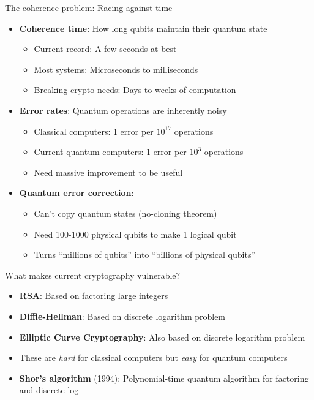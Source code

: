 \documentclass[aspectratio=169, lualatex, handout]{beamer}
\begin{document}
\begin{frame}{The coherence problem: Racing against time}
	\begin{itemize}
		\item \textbf{Coherence time}: How long qubits maintain their quantum state
		      \begin{itemize}
			      \item Current record: A few seconds at best
			      \item Most systems: Microseconds to milliseconds
			      \item Breaking crypto needs: Days to weeks of computation
		      \end{itemize}
		\item \textbf{Error rates}: Quantum operations are inherently noisy
		      \begin{itemize}
			      \item Classical computers: 1 error per $10^{17}$ operations
			      \item Current quantum computers: 1 error per $10^{3}$ operations
			      \item Need massive improvement to be useful
		      \end{itemize}
		\item \textbf{Quantum error correction}:
		      \begin{itemize}
			      \item Can't copy quantum states (no-cloning theorem)
			      \item Need 100-1000 physical qubits to make 1 logical qubit
			      \item Turns ``millions of qubits'' into ``billions of physical qubits''
		      \end{itemize}
	\end{itemize}
\end{frame}

\begin{frame}{What makes current cryptography vulnerable?}
	\begin{itemize}
		\item \textbf{RSA}: Based on factoring large integers
		\item \textbf{Diffie-Hellman}: Based on discrete logarithm problem
		\item \textbf{Elliptic Curve Cryptography}: Also based on discrete logarithm problem
		\item These are \textit{hard} for classical computers but \textit{easy} for quantum computers
		\item \textbf{Shor's algorithm} (1994): Polynomial-time quantum algorithm for factoring and discrete log
	\end{itemize}
\end{frame}
\end{document}
